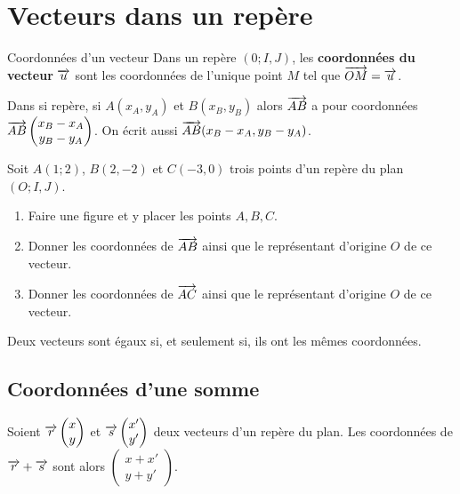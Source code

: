 \documentclass[11pt]{article}
\begin{document}
\section{Vecteurs dans un repère}
\begin{defi}{Coordonnées d'un vecteur}
  Dans un repère $(0; I, J)$, les \textbf{coordonnées du vecteur} $\overrightarrow{u}$ sont
  les coordonnées de l'unique point $M$ tel que $\overrightarrow{OM}=\overrightarrow{u}$.
\end{defi}
\begin{prop}
  Dans si repère, si $A(x_A, y_A)$ et $B(x_B, y_B)$ alors $\overrightarrow{AB}$ a pour
  coordonnées $\overrightarrow{AB}\begin{pmatrix}x_B-x_A\\y_B-y_A\end{pmatrix}$. On écrit
  aussi $\overrightarrow{AB}(x_B-x_A,y_B-y_A)$.
\end{prop}
\begin{app}
  Soit $A(1;2)$, $B(2, -2)$ et $C(-3, 0)$ trois points d'un repère du plan $(O;
  I, J)$.
  \begin{enumerate}
    \item Faire une figure et y placer les points $A, B, C$.
    \item Donner les coordonnées de $\overrightarrow{AB}$ ainsi que le représentant
      d'origine $O$ de ce vecteur.
    \item Donner les coordonnées de $\overrightarrow{AC}$ ainsi que le représentant
      d'origine $O$ de ce vecteur.
  \end{enumerate}
\end{app}

\begin{prop}
  Deux vecteurs sont égaux si, et seulement si, ils ont les mêmes coordonnées.
\end{prop}

\subsection{Coordonnées d'une somme}
\begin{prop}
  Soient $\overrightarrow{r}\begin{pmatrix}x\\y\end{pmatrix}$ et
  $\overrightarrow{s}\begin{pmatrix}x'\\y'\end{pmatrix}$ deux vecteurs d'un repère du plan.
  Les coordonnées de $\overrightarrow{r}+\overrightarrow{s}$ sont alors
  $\begin{pmatrix}x+x'\\y+y'\end{pmatrix}$.
\end{prop}
\end{document}
